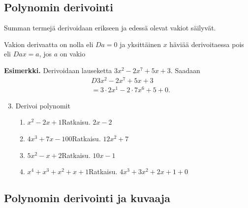 \documentclass[10pt]{article}
\newcommand{\ratkaisu}[1]{\hfill{\color{blue}\quad\textrm{Ratkaisu. } #1}}
\begin{document}
\subsection{Polynomin derivointi}

Summan termejä derivoidaan erikseen ja edessä olevat vakiot säilyvät. %

Vakion derivaatta on nolla eli $Da=0$ ja yksittäinen $x$ häviää derivoitaessa pois eli $Dax=a$, jos $a$ on vakio

\textbf{Esimerkki.} Derivoidaan lauseketta $3x^2-2x^7+5x+3$. Saadaan
\begin{equation*}
\begin{split}
&D 3x^2-2x^7+5x+3\\
&=3\cdot 2x^1-2\cdot 7x^6+5+0.
\end{split}
\end{equation*}

\begin{enumerate}
\setcounter{enumi}{2}
\item Derivoi polynomit
\begin{enumerate}
\item $x^2-2x+1$\ratkaisu{$2x-2$}
\item $4x^3+7x-100$\ratkaisu{$12x^2+7$}
\item $5x^2-x+2$\ratkaisu{$10x-1$}
\item $x^4+x^3+x^2+x+1$\ratkaisu{$4x^3+3x^2+2x+1+0$}
\end{enumerate}
\end{enumerate}

\newpage

\subsection{Polynomin derivointi ja kuvaaja}
\end{document}
